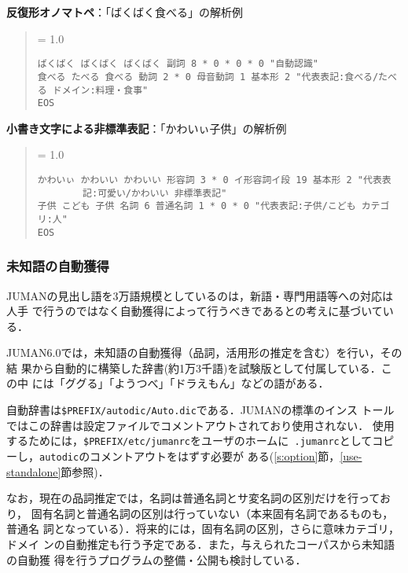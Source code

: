 \documentclass[a4j,titlepage]{jarticle}
\begin{document}
\noindent
{\bf 反復形オノマトペ}：「ばくばく食べる」の解析例
\begin{quote}
{\baselineskip = 1.0 \baselineskip
\begin{verbatim}
ばくばく ばくばく ばくばく 副詞 8 * 0 * 0 * 0 "自動認識"
食べる たべる 食べる 動詞 2 * 0 母音動詞 1 基本形 2 "代表表記:食べる/たべる ドメイン:料理・食事"
EOS
\end{verbatim}
}
\end{quote}

\noindent
{\bf 小書き文字による非標準表記}：「かわいぃ子供」の解析例
\begin{quote}
{\baselineskip = 1.0 \baselineskip
\begin{verbatim}
かわいぃ かわいい かわいい 形容詞 3 * 0 イ形容詞イ段 19 基本形 2 "代表表
		記:可愛い/かわいい 非標準表記"
子供 こども 子供 名詞 6 普通名詞 1 * 0 * 0 "代表表記:子供/こども カテゴリ:人"
EOS
\end{verbatim}
}
\end{quote}

\subsubsection{未知語の自動獲得}

JUMANの見出し語を3万語規模としているのは，新語・専門用語等への対応は人手
で行うのではなく自動獲得によって行うべきであるとの考えに基づいている．

JUMAN6.0では，未知語の自動獲得（品詞，活用形の推定を含む）を行い，その結
果から自動的に構築した辞書(約1万3千語)を試験版として付属している．この中
には「ググる」「ようつべ」「ドラえもん」などの語がある．

自動辞書は\texttt{\$PREFIX/autodic/Auto.dic}である．JUMANの標準のインス
トールではこの辞書は設定ファイルでコメントアウトされており使用されない．
使用するためには，\texttt{\$PREFIX/etc/jumanrc}をユーザのホームに{\tt
.jumanrc}としてコピーし，\texttt{autodic}のコメントアウトをはずす必要が
ある(\ref{s:option}節，\ref{use-standalone}節参照)．

なお，現在の品詞推定では，名詞は普通名詞とサ変名詞の区別だけを行っており，
固有名詞と普通名詞の区別は行っていない（本来固有名詞であるものも，普通名
詞となっている）．将来的には，固有名詞の区別，さらに意味カテゴリ，ドメイ
ンの自動推定も行う予定である．また，与えられたコーパスから未知語の自動獲
得を行うプログラムの整備・公開も検討している．
\end{document}
